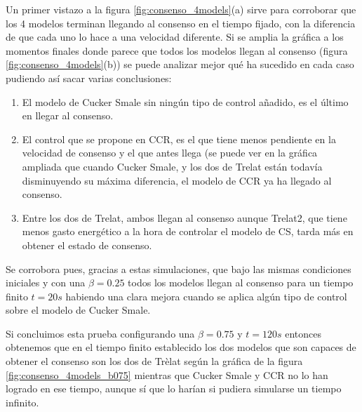 Un primer vistazo a la figura \ref{fig:consenso_4models}(a) sirve para corroborar que los 4 modelos terminan llegando al consenso en el tiempo fijado, con la diferencia de que cada uno lo hace a una velocidad diferente. Si se amplia la gráfica a los momentos finales donde parece que todos los modelos llegan al consenso (figura \ref{fig:consenso_4models}(b)) se puede analizar mejor qué ha sucedido en cada caso pudiendo así sacar varias conclusiones:

\begin{enumerate}
    \item El modelo de Cucker Smale sin ningún tipo de control añadido, es el último en llegar al consenso.
    \item El control que se propone en CCR, es el que tiene menos pendiente en la velocidad de consenso y el que antes llega (se puede ver en la gráfica ampliada que cuando Cucker Smale, y los dos de Trelat están todavía disminuyendo su máxima diferencia, el modelo de CCR ya ha llegado al consenso. 
    \item Entre los dos de Trelat, ambos llegan al consenso aunque Trelat2, que tiene menos gasto energético a la hora de controlar el modelo de CS, tarda más en obtener el estado de consenso.
\end{enumerate}

Se corrobora pues, gracias a estas simulaciones, que bajo las mismas condiciones iniciales y con una $\beta = 0.25$ todos los modelos llegan al consenso para un tiempo finito $t=20s$ habiendo una clara mejora cuando se aplica algún tipo de control sobre el modelo de Cucker Smale.

Si concluimos esta prueba configurando una $\beta=0.75$ y $t=120s$ entonces obtenemos que en el tiempo finito establecido los dos modelos que son capaces de obtener el consenso son los dos de Trèlat según la gráfica de la figura \ref{fig:consenso_4models_b075} mientras que Cucker Smale y CCR no lo han logrado en ese tiempo, aunque sí que lo harían si pudiera simularse un tiempo infinito.

